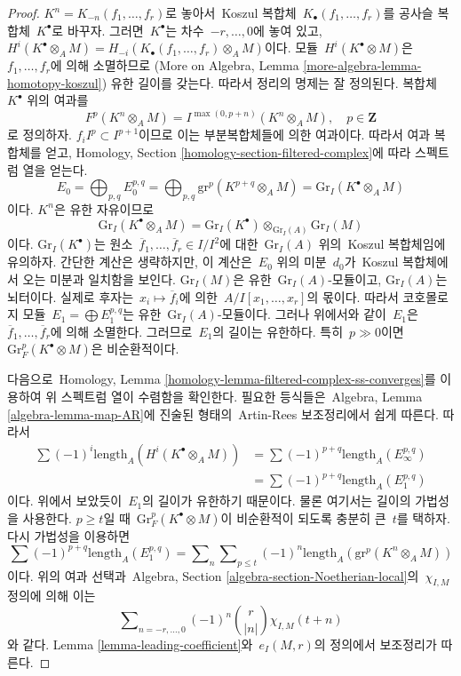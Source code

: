 \begin{proof}
$K^n = K_{-n}(f_1, \ldots, f_r)$로 놓아서\  Koszul 복합체\ 
$K_\bullet(f_1, \ldots, f_r)$를 공사슬 복합체\  $K^\bullet$로 바꾸자.
그러면\  $K^\bullet$는 차수\  $-r, \ldots, 0$에 놓여 있고,
$H^i(K^\bullet \otimes_A M) = H_{-i}(K_\bullet(f_1, \ldots, f_r) \otimes_A M)$이다.
모듈\  $H^i(K^\bullet \otimes M)$은\  $f_1, \ldots, f_r$에 의해 소멸하므로
(More on Algebra, Lemma
\ref{more-algebra-lemma-homotopy-koszul}) 유한 길이를 갖는다. 따라서
정리의 명제는 잘 정의된다.
복합체\  $K^\bullet$ 위의 여과를
$$
F^p(K^n \otimes_A M) =
I^{\max(0, p + n)}(K^n \otimes_A M),\quad p \in \mathbf{Z}
$$
로 정의하자. $f_i I^p \subset I^{p + 1}$이므로 이는 부분복합체들에 의한
여과이다. 따라서 여과 복합체를 얻고, Homology, Section
\ref{homology-section-filtered-complex}에 따라 스펙트럼 열을 얻는다.
$$
E_0 = \bigoplus\nolimits_{p, q} E_0^{p, q} =
\bigoplus\nolimits_{p, q} \text{gr}^p(K^{p + q} \otimes_A M) =
\text{Gr}_I(K^\bullet \otimes_A M)
$$
이다. $K^n$은 유한 자유이므로
$$
\text{Gr}_I(K^\bullet \otimes_A M) =
\text{Gr}_I(K^\bullet) \otimes_{\text{Gr}_I(A)} \text{Gr}_I(M)
$$
이다. $\text{Gr}_I(K^\bullet)$는 원소\ 
$\overline{f}_1, \ldots, \overline{f}_r \in I/I^2$에 대한\ 
$\text{Gr}_I(A)$ 위의\  Koszul 복합체임에 유의하자.
간단한 계산은 생략하지만, 이 계산은\  $E_0$ 위의 미분\  $d_0$가\  Koszul
복합체에서 오는 미분과 일치함을 보인다.
$\text{Gr}_I(M)$은 유한\  $\text{Gr}_I(A)$-모듈이고,
$\text{Gr}_I(A)$는 뇌터이다. 실제로 후자는\ 
$x_i \mapsto \overline{f}_i$에 의한\ 
$A/I[x_1, \ldots, x_r]$의 몫이다. 따라서 코호몰로지 모듈\ 
$E_1 = \bigoplus E_1^{p, q}$는 유한\  $\text{Gr}_I(A)$-모듈이다.
그러나 위에서와 같이\  $E_1$은\ 
$\overline{f}_1, \ldots, \overline{f}_r$에 의해 소멸한다.
그러므로\  $E_1$의 길이는 유한하다.
특히\  $p \gg 0$이면\  $\text{Gr}^p_F(K^\bullet \otimes M)$은
비순환적이다.

\medskip\noindent
다음으로\  Homology, Lemma
\ref{homology-lemma-filtered-complex-ss-converges}를 이용하여 위 스펙트럼
열이 수렴함을 확인한다. 필요한 등식들은\  Algebra, Lemma
\ref{algebra-lemma-map-AR}에 진술된 형태의\  Artin-Rees 보조정리에서 쉽게
따른다. 따라서
\begin{align*}
\sum (-1)^i\text{length}_A(H^i(K^\bullet \otimes_A M))
& =
\sum (-1)^{p + q} \text{length}_A(E_\infty^{p, q}) \\
& =
\sum (-1)^{p + q} \text{length}_A(E_1^{p, q})
\end{align*}
이다. 위에서 보았듯이\  $E_1$의 길이가 유한하기 때문이다. 물론 여기서는
길이의 가법성을 사용한다.
$p \geq t$일 때\  $\text{Gr}^p_F(K^\bullet \otimes M)$이 비순환적이 되도록
충분히 큰\  $t$를 택하자. 다시 가법성을 이용하면
$$
\sum (-1)^{p + q} \text{length}_A(E_1^{p, q}) =
\sum\nolimits_n \sum\nolimits_{p \leq t}
(-1)^n \text{length}_A(\text{gr}^p(K^n \otimes_A M))
$$
이다. 위의 여과 선택과\  Algebra, Section
\ref{algebra-section-Noetherian-local}의\  $\chi_{I, M}$ 정의에 의해 이는
$$
\sum\nolimits_{n = -r, \ldots, 0} (-1)^n{r \choose |n|} \chi_{I, M}(t + n)
$$
와 같다. Lemma \ref{lemma-leading-coefficient}와\  $e_I(M, r)$의 정의에서
보조정리가 따른다.
\end{proof}

